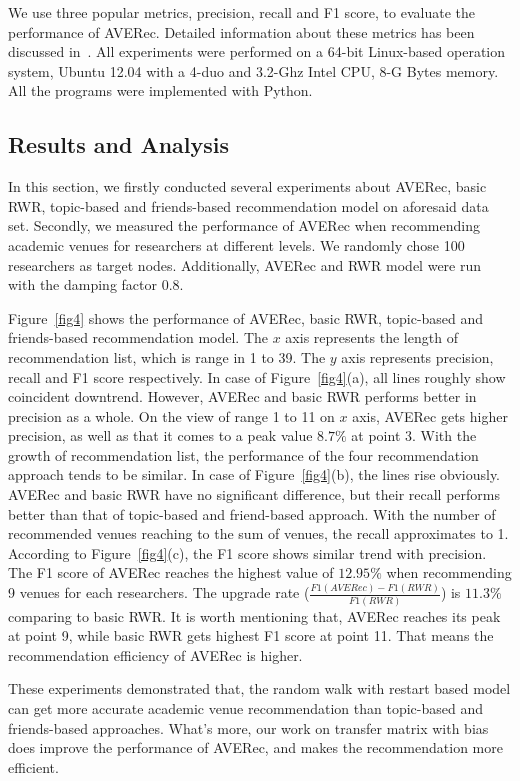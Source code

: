 \documentclass[9pt]{acm_proc_article-sp}
\begin{document}
We use three popular metrics, precision, recall and F1 score, to evaluate the performance of AVERec. Detailed information about these metrics has been discussed in~\cite{xia2014mvcwalker}. All experiments were performed on a 64-bit Linux-based operation system, Ubuntu 12.04 with a 4-duo and 3.2-Ghz Intel CPU, 8-G Bytes memory. All the programs were implemented with Python.

\subsection{Results and Analysis}
In this section, we firstly conducted several experiments about AVERec, basic RWR, topic-based and friends-based recommendation model on aforesaid data set. Secondly, we measured the performance of AVERec when recommending academic venues for researchers at different levels. We randomly chose 100 researchers as target nodes. Additionally, AVERec and RWR model were run with the damping factor 0.8.

Figure~\ref{fig4} shows the performance of AVERec, basic RWR, topic-based and friends-based recommendation model. The $x$ axis represents the length of recommendation list, which is range in 1 to 39. The $y$ axis represents precision, recall and F1 score respectively. In case of Figure~\ref{fig4}(a), all lines roughly show coincident downtrend. However, AVERec and basic RWR performs better in precision as a whole. On the view of range 1 to 11 on $x$ axis, AVERec gets higher precision, as well as that it comes to a peak value $8.7\%$ at point 3. With the growth of recommendation list, the performance of the four recommendation approach tends to be similar. In case of Figure~\ref{fig4}(b), the lines rise obviously. AVERec and basic RWR have no significant difference, but their recall performs better than that of topic-based and friend-based approach. With the number of recommended venues reaching to the sum of venues, the recall approximates to 1. According to Figure~\ref{fig4}(c), the F1 score shows similar trend with precision. The F1 score of AVERec reaches the highest value of $12.95\%$ when recommending 9 venues for each researchers. The upgrade rate ($\frac{F1(AVERec)-F1(RWR)}{F1(RWR)}$) is $11.3\%$ comparing to basic RWR. It is worth mentioning that, AVERec reaches its peak at point 9, while basic RWR gets highest F1 score at point 11. That means the recommendation efficiency of AVERec is higher.

These experiments demonstrated that, the random walk with restart based model can get more accurate academic venue recommendation than topic-based and friends-based approaches. What's more, our work on transfer matrix with bias does improve the performance of AVERec, and makes the recommendation more efficient.
\end{document}

